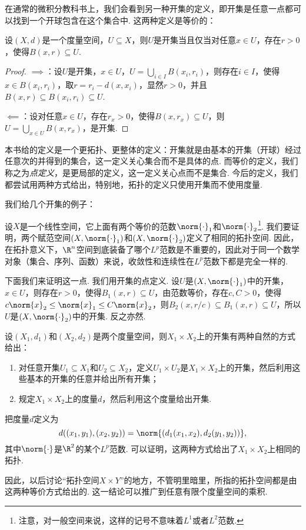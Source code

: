 在通常的微积分教科书上，我们会看到另一种开集的定义，即开集是任意一点都可以找到一个开球包含在这个集合中. 这两种定义是等价的：

\begin{proposition}\label{prop:open-ball}
    设$(X,d)$是一个度量空间，$U\subseteq X$，则$U$是开集当且仅当对任意$x\in U$，存在$r>0$，使得$B(x,r)\subseteq U$.
\end{proposition}
\begin{proof}
   $\implies$：设$U$是开集，$x\in U$，$U=\bigcup_{i\in I}B(x_i,r_i)$，则存在$i\in I$，使得$x\in B(x_i,r_i)$，取$r=r_i-d(x,x_i)$，显然$r>0$，并且$B(x,r)\subseteq B(x_i,r_i)\subseteq U$.

    $\impliedby$：设对任意$x\in U$，存在$r_x>0$，使得$B(x,r_x)\subseteq U$，则$U=\bigcup_{x\in U}B(x,r_x)$，是开集. 
\end{proof}

本书给的定义是一个更拓扑、更整体的定义：开集就是由基本的开集（开球）经过任意次的并得到的集合，这一定义关心集合而不是具体的点. 而等价的定义，我们称之为\emph{点定义}，是更局部的定义，这一定义关心点而不是集合. 今后的定义，我们都尝试用两种方式给出，特别地，拓扑的定义只使用开集而不使用度量. 


我们给几个开集的例子：
\begin{example}[范等价拓扑空间]\label{ex:lp-topology}
    设$X$是一个线性空间，它上面有两个等价的范数$\norm{\cdot}_1$和$\norm{\cdot}_2$\footnote{注意，对一般空间来说，这样的记号不意味着$L^1$或者$L^2$范数. }. 我们要证明，两个赋范空间$(X,\norm{\cdot}_1)$和$(X,\norm{\cdot}_2)$定义了相同的拓扑空间. 因此，在拓扑意义下，$\R^n$空间到底装备了哪个$L^p$范数是不重要的，因此对于同一个数学对象（集合、序列、函数）来说，收敛性和连续性在$L^p$范数下都是完全一样的. 

    下面我们来证明这一点. 我们用开集的点定义. 设$U$是$(X,\norm{\cdot}_1)$中的开集，$x\in U$，则存在$r>0$，使得$B_1(x,r)\subseteq U$，由范数等价，存在$c,C>0$，使得$c\norm{x}_2\leq \norm{x}_1\leq C\norm{x}_2$，则$B_2(x,r/c)\subseteq B_1(x,r)\subseteq U$，所以$U$是$(X,\norm{\cdot}_2)$中的开集. 反之亦然. 
\end{example}

\begin{example}[乘积拓扑空间]\label{ex:product-topology}
    设$(X_1,d_1)$和$(X_2,d_2)$是两个度量空间，则$X_1\times X_2$上的开集有两种自然的方式给出：
    \begin{enumerate}
        \item 对任意开集$U_1\subseteq X_1$和$U_2\subseteq X_2$，定义$U_1\times U_2$是$X_1\times X_2$上的开集，然后利用这些基本的开集的任意并给出所有开集；
        \item 规定$X_1\times X_2$上的度量$d$，然后利用这个度量给出开集. 
    \end{enumerate}

    把度量$d$定义为
    \[d((x_1,y_1),(x_2,y_2))=\norm{(d_1(x_1,x_2),d_2(y_1,y_2))},\]
    其中$\norm{\cdot}$是$\R^2$的某个$L^p$范数. 可以证明，这两种方式给出了$X_1\times X_2$上相同的拓扑. 
    
    因此，以后讨论“拓扑空间$X\times Y$”的地方，不管明里暗里，所指的拓扑空间都是由这两种等价方式给出的. 这一结论可以推广到任意有限个度量空间的乘积. 
\end{example}

